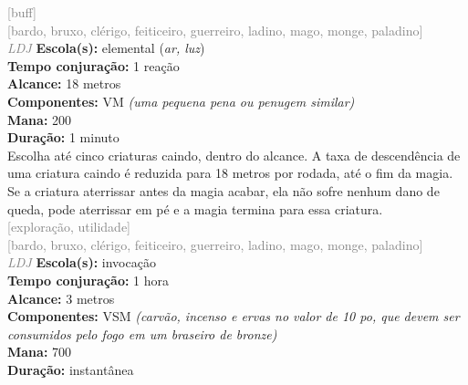 \documentclass{RPG_Adventure}[2021/10/20]
\begin{document}
{\scriptsize \textcolor{gray}{[buff]\\}}
{\scriptsize \textcolor{gray}{[bardo, bruxo, clérigo, feiticeiro, guerreiro, ladino, mago, monge, paladino]\\}}
{\tiny \textcolor{gray}{\textit{LDJ}}}
{\small \t \textbf{Escola(s):} elemental (\textit{ar, luz})\\\t \textbf{Tempo conjuração:} 1 reação\\\t \textbf{Alcance:} 18 metros\\\t \textbf{Componentes:} VM \textit{(uma pequena pena ou penugem similar)}\\\t \textbf{Mana:} 200\\\t \textbf{Duração:} 1 minuto\\}
{\normalsize Escolha até cinco criaturas caindo, dentro do alcance. A taxa de descendência de uma criatura caindo é reduzida para 18 metros por rodada, até o fim da magia. Se a criatura aterrissar antes da magia acabar, ela não sofre nenhum dano de queda, pode aterrissar em pé e a magia termina para essa criatura.\\}
{\scriptsize \textcolor{gray}{[exploração, utilidade]\\}}
{\scriptsize \textcolor{gray}{[bardo, bruxo, clérigo, feiticeiro, guerreiro, ladino, mago, monge, paladino]\\}}
{\tiny \textcolor{gray}{\textit{LDJ}}}
{\small \t \textbf{Escola(s):} invocação\\\t \textbf{Tempo conjuração:} 1 hora\\\t \textbf{Alcance:} 3 metros\\\t \textbf{Componentes:} VSM \textit{(carvão, incenso e ervas no valor de 10 po, que devem ser consumidos pelo fogo em um braseiro de bronze)}\\\t \textbf{Mana:} 700\\\t \textbf{Duração:} instantânea\\}
\end{document}
